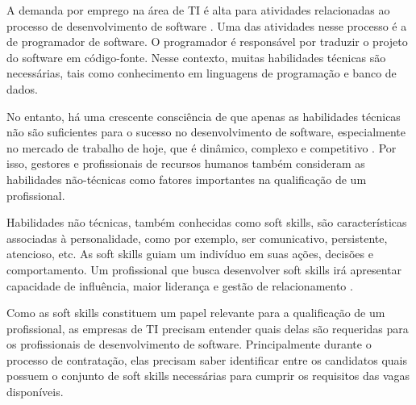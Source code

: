
A demanda por emprego na área de TI é alta para atividades relacionadas ao processo de desenvolvimento de software \cite{kennan:09}. Uma das atividades nesse processo é a de programador de software. O programador é responsável por traduzir o projeto do software em código-fonte. Nesse contexto, muitas habilidades técnicas são necessárias, tais como conhecimento em linguagens de programação e banco de dados.

No entanto, há uma crescente consciência de que apenas as habilidades técnicas não são suficientes para o sucesso no desenvolvimento de software, especialmente no mercado de trabalho de hoje, que é dinâmico, complexo e competitivo \cite{joseph:10}. Por isso, gestores e profissionais de recursos humanos também consideram as habilidades não-técnicas como fatores importantes na qualificação de um profissional.

Habilidades não técnicas, também conhecidas como soft skills, são características associadas à personalidade, como por exemplo, ser comunicativo, persistente, atencioso, etc. As soft skills guiam um indivíduo em suas ações, decisões e comportamento. Um profissional que busca desenvolver soft skills irá apresentar capacidade de influência, maior liderança e gestão de relacionamento \cite{hjyunus:12}.

Como as soft skills constituem um papel relevante para a qualificação de um profissional, as empresas de TI precisam entender quais delas são requeridas para os profissionais de desenvolvimento de software. Principalmente durante o processo de contratação, elas precisam saber identificar entre os candidatos quais possuem o conjunto de soft skills necessárias para cumprir os requisitos das vagas disponíveis.

